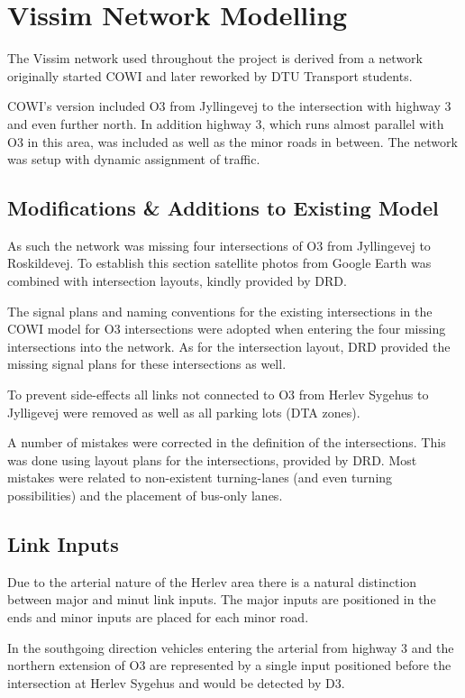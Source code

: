 \section{Vissim Network Modelling}
\label{modelling}
The Vissim network used throughout the project is derived from a network originally started COWI and later reworked by DTU Transport students.

COWI's version included O3 from Jyllingevej to the intersection with highway 3 and even further north. In addition highway 3, which runs almost parallel with O3 in this area, was included as well as the minor roads in between.
The network was setup with dynamic assignment of traffic.

\subsection{Modifications \& Additions to Existing Model}

As such the network was missing four intersections of O3 from Jyllingevej to Roskildevej. To establish this section satellite photos from Google Earth was combined with intersection layouts, kindly provided by DRD.

The signal plans and naming conventions for the existing intersections in the COWI model for O3 intersections were adopted when entering the four missing intersections into the network. As for the intersection layout, DRD provided the missing signal plans for these intersections as well.

To prevent side-effects all links not connected to O3 from Herlev Sygehus to Jylligevej were removed as well as all parking lots (DTA zones).

A number of mistakes were corrected in the definition of the intersections. This was done using layout plans for the intersections, provided by DRD. Most mistakes were related to non-existent turning-lanes (and even turning possibilities) and the placement of bus-only lanes. 

\subsection{Link Inputs}

Due to the arterial nature of the Herlev area there is a natural distinction between major and minut link inputs. The major inputs are positioned in the ends and minor inputs are placed for each minor road.

In the southgoing direction vehicles entering the arterial from highway 3 and the northern extension of O3 are represented by a single input positioned before the intersection at Herlev Sygehus and would be detected by D3.

